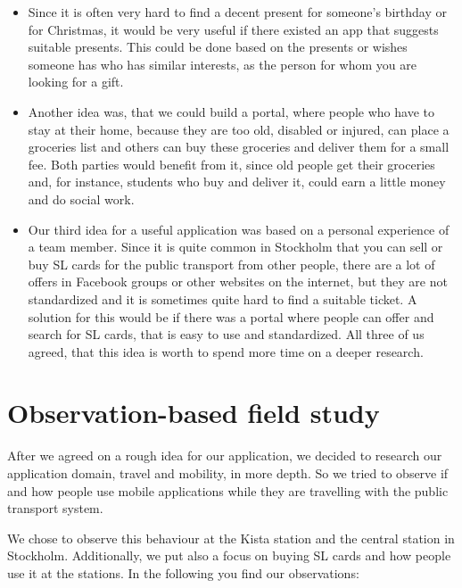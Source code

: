 \documentclass[11pt,twoside,a4paper]{report}
\begin{document}
\begin{itemize}
	\item Since it is often very hard to find a decent present for someone’s birthday or for Christmas, it would be very useful if there existed an app that suggests suitable presents. This could be done based on the presents or wishes someone has who has similar interests, as the person for whom you are looking for a gift.
	\item Another idea was, that we could build a portal, where people who have to stay at their home, because they are too old, disabled or injured, can place a groceries list and others can buy these groceries and deliver them for a small fee. Both parties would benefit from it, since old people get their groceries and, for instance, students who buy and deliver it, could earn a little money and do social work.
	\item Our third idea for a useful application was based on a personal experience of a team member. Since it is quite common in Stockholm that you can sell or buy SL cards for the public transport from other people, there are a lot of offers in Facebook groups or other websites on the internet, but they are not standardized and it is sometimes quite hard to find a suitable ticket. A solution for this would be if there was a portal where people can offer and search for SL cards, that is easy to use and standardized. All three of us agreed, that this idea is worth to spend more time on a deeper research.
\end{itemize}

\section{Observation-based field study}

After we agreed on a rough idea for our application, we decided to research our application domain, travel and mobility, in more depth. So we tried to observe if and how people use mobile applications while they are travelling with the public transport system.

We chose to observe this behaviour at the Kista station and the central station in Stockholm. Additionally, we put also a focus on buying SL cards and how people use it at the stations. In the following you find our observations:
\end{document}
